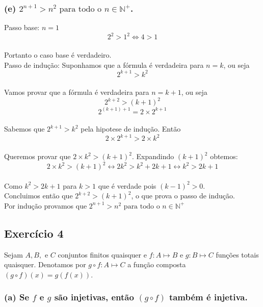 \documentclass{article}
\begin{document}
\subsubsection*{(e) $2^{n+1} > n^2 \textrm{ para todo o } n \in \mathbb{N}^+$.}

Passo base: $n=1$
\\[\baselineskip]
\[
  2^2 > 1^2 \Leftrightarrow 4>1
\]
\\[\baselineskip]
Portanto o caso base é verdadeiro.
\\[\baselineskip]
Passo de indução: Suponhamos que a fórmula é verdadeira para $n=k$, ou seja
\\[\baselineskip]
\[
  2^{k+1} > k^2
\]
\\[\baselineskip]
Vamos provar que a fórmula é verdadeira para $n=k+1$, ou seja
\\[\baselineskip]
\[
  2^{k+2} > {(k+1)}^{2}
\]
\[
  2^{(k+1)+1} = 2 \times 2^{k+1}
\]
\\[\baselineskip]
Sabemos que $2^{k+1} > k^2$ pela hipotese de indução. Então
\\[\baselineskip]
\[
  2 \times 2^{k+1} > 2 \times k^2
\]
\\[\baselineskip]
Queremos provar que $2 \times k^2 > {(k+1)}^{2}$. Expandindo ${(k+1)}^2$ obtemos:
\\[\baselineskip]
\[
  2 \times k^2 > {(k+1)}^{2} \leftrightarrow 2k^2 > k^2 + 2k + 1 \leftrightarrow k^2 > 2k + 1
\]
\\[\baselineskip]
Como $k^2 > 2k + 1$ para $k > 1$ que é verdade pois ${(k - 1)}^2 > 0$.
\\[\baselineskip]
Concluimos então que $2^{k+2} > {(k+1)}^{2}$, o que prova o passo de indução.
\\[\baselineskip]
Por indução provamos que $2^{n+1} > n^2 \textrm{ para todo o } n \in \mathbb{N}^+$

\subsection*{Exercício 4}
Sejam $A, B, \textrm{ e } C$ conjuntos finitos quaisquer e $f : A \longmapsto B$ e $g : B \longmapsto C$ funções totais quaisquer. Denotamos por $g \circ f : A \longmapsto C$ a função composta $(g \circ f)(x) = g(f(x))$.

\subsubsection*{(a) Se $f$ e $g$ são injetivas, então $(g \circ f)$ também é injetiva.}
\end{document}

